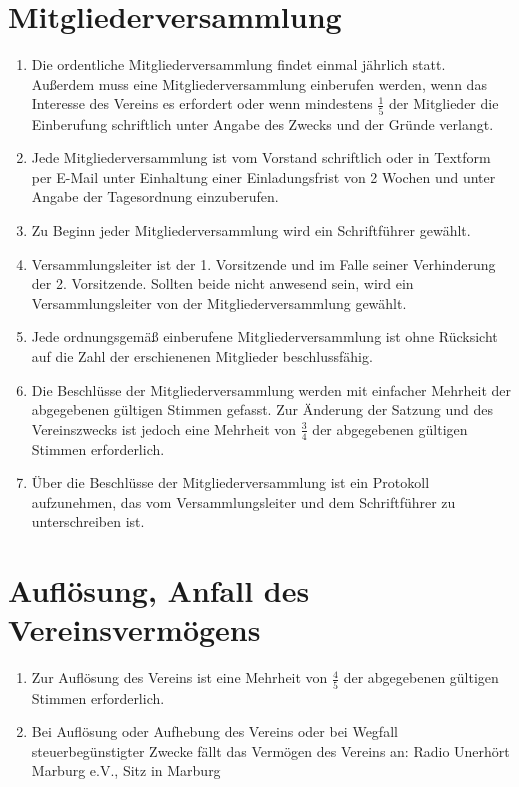 \documentclass[10pt,conference,a4paper,nofonttune]{IEEEtran}
\begin{document}
\section{Mitgliederversammlung}
\begin{enumerate}
  \item Die ordentliche Mitgliederversammlung findet einmal jährlich statt.
    Außerdem muss eine Mitgliederversammlung einberufen werden, wenn das
    Interesse des Vereins es erfordert oder wenn mindestens $\frac{1}{5}$ der
    Mitglieder die Einberufung schriftlich unter Angabe des Zwecks und der
    Gründe verlangt.

  \item Jede Mitgliederversammlung ist vom Vorstand schriftlich oder in Textform
    per E-Mail unter Einhaltung einer Einladungsfrist von 2 Wochen und unter
    Angabe der Tagesordnung einzuberufen.

  \item Zu Beginn jeder Mitgliederversammlung wird ein Schriftführer gewählt.

  \item Versammlungsleiter ist der 1. Vorsitzende und im Falle seiner
    Verhinderung der 2. Vorsitzende. Sollten beide nicht anwesend sein, wird ein
    Versammlungsleiter von der Mitgliederversammlung gewählt.

  \item Jede ordnungsgemäß einberufene Mitgliederversammlung ist ohne Rücksicht
    auf die Zahl der erschienenen Mitglieder beschlussfähig.

  \item Die Beschlüsse der Mitgliederversammlung werden mit einfacher Mehrheit
    der abgegebenen gültigen Stimmen gefasst. Zur Änderung der Satzung und des
    Vereinszwecks ist jedoch eine Mehrheit von $\frac{3}{4}$ der abgegebenen
    gültigen Stimmen erforderlich.

  \item Über die Beschlüsse der Mitgliederversammlung ist ein Protokoll
    aufzunehmen, das vom Versammlungsleiter und dem Schriftführer zu
    unterschreiben ist.
\end{enumerate}


\section{Auflösung, Anfall des Vereinsvermögens}
\begin{enumerate}
  \item Zur Auflösung des Vereins ist eine Mehrheit von $\frac{4}{5}$ der
    abgegebenen gültigen Stimmen erforderlich.

  \item Bei Auflösung oder Aufhebung des Vereins oder bei Wegfall
    steuerbegünstigter Zwecke fällt das Vermögen des Vereins an:
    Radio Unerhört Marburg e.V., Sitz in Marburg
\end{enumerate}
\end{document}
